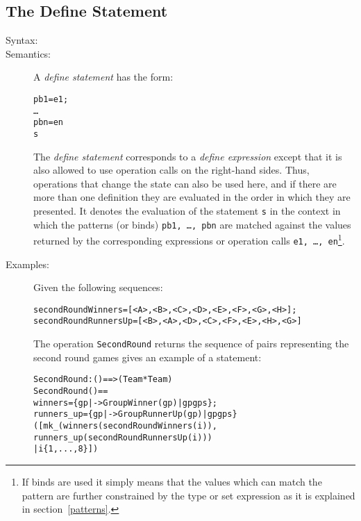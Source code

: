 \documentclass[\pformat,12pt]{article}
\begin{document}
\subsection{The Define Statement}\label{defstmt}

\begin{description}
\item[Syntax:]



\item[Semantics:] A {\it define statement} has the form:
  \begin{alltt}
     pb1 = e1;
        \ldots
        pbn = en
      s
  \end{alltt}
  The {\it define statement} corresponds to a {\it define expression}
  except that it is also allowed to use operation calls on the right-hand
  sides. Thus, operations that change the state can also be used here, and
  if there are more than one definition they are evaluated in the order in
  which they are presented.  It denotes the evaluation of the statement
  {\tt s} in the context in which the patterns (or binds) {\tt pb1, \ldots,
    pbn} are matched against the values returned by the corresponding
  expressions or operation calls {\tt e1, \ldots, en}\footnote{If binds are
    used it simply means that the values which can match the pattern are
    further constrained by the type or set expression as it is explained in
    section~\ref{patterns}.}.

\item[Examples:] Given the following sequences:
  \begin{alltt}
  secondRoundWinners = [<A>,<B>,<C>,<D>,<E>,<F>,<G>,<H>];
  secondRoundRunnersUp = [<B>,<A>,<D>,<C>,<F>,<E>,<H>,<G>]
  \end{alltt}
  The operation \texttt{SecondRound}%
  returns the sequence of pairs 
  representing the second round games gives an example of a  
  statement:
  \begin{alltt}
  SecondRound : () ==>  (Team * Team)
  SecondRound () ==
   winners = \{ gp |-> GroupWinner(gp) | gp  gps \};
     runners_up = \{ gp |-> GroupRunnerUp(gp) | gp  gps\}
   ([mk_(winners(secondRoundWinners(i)),
                runners_up(secondRoundRunnersUp(i))) 
           | i  \{1,...,8\}])
  \end{alltt}

\end{description}
\end{document}
